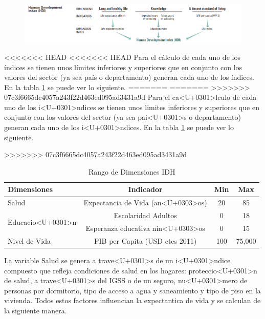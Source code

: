 \documentclass{article}
\begin{document}
\begin{figure}[h]
\centering
\includegraphics{hdiCalc}
\label {IDH}
\end{figure}

<<<<<<< HEAD
<<<<<<< HEAD
Para el cálculo de cada uno de los índices se tienen unos límites inferiores y superiores que en conjunto con los valores del sector (ya sea país o departamento) generan cada uno de los índices. En la tabla \ref{Tabla 1:} se puede ver lo siguiente.
=======
=======
>>>>>>> 07c3f6665dc4057a243f22d463ed095ad3431a9d
Para el ca<U+0301>lculo de cada uno de los i<U+0301>ndices se tienen unos limites inferiores y superiores que en conjunto con los valores del sector (ya sea pai<U+0301>s o departamento) generan cada uno de los i<U+0301>ndices. En la tabla \ref{Tabla 1:} se puede ver lo siguiente.

>>>>>>> 07c3f6665dc4057a243f22d463ed095ad3431a9d

\begin{table}[h!]
\centering
  \begin{tabular}{l c c c}
  \hline
  Dimensiones & Indicador & Min & Max \\ [0.25ex]
  \hline \hline
  Salud & Expectancia de Vida (an<U+0303>os) & 20 & 85 \\
  \multirow{2}{*}{Educacio<U+0301>n} & Escolaridad Adultos & 0 & 18 \\ 
   & Esperanza educativa nin<U+0303>os & 0 & 15 \\
  Nivel de Vida  & PIB per Capita (USD ctes 2011) & 100 & 75,000 \\
  \hline
  \end{tabular}
 \caption {Rango de Dimensiones IDH}
  \label{Tabla 1:}
\end {table} 

La variable Salud se genera a trave<U+0301>s de un i<U+0301>ndice compuesto que refleja condiciones de salud en los hogares: proteccio<U+0301>n de salud, a trave<U+0301>s del IGSS o de un seguro, nu<U+0301>mero de personas por dormitorio, tipo de acceso a agua y saneamiento y tipo de piso en la vivienda. Todos estos factores influencian la expectantica de vida y se calculan de la siguiente manera.
\end{document}
